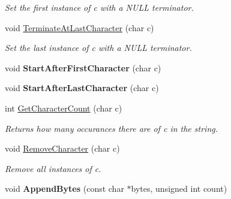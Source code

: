 \begin{DoxyCompactItemize}
\begin{DoxyCompactList}\small\item\em Set the first instance of c with a N\-U\-L\-L terminator. \end{DoxyCompactList}\item 
\hypertarget{class_rak_net_1_1_rak_string_a47359a2ee66669ab9a1873d49a06eab4}{void \hyperlink{class_rak_net_1_1_rak_string_a47359a2ee66669ab9a1873d49a06eab4}{Terminate\-At\-Last\-Character} (char c)}\label{class_rak_net_1_1_rak_string_a47359a2ee66669ab9a1873d49a06eab4}

\begin{DoxyCompactList}\small\item\em Set the last instance of c with a N\-U\-L\-L terminator. \end{DoxyCompactList}\item 
\hypertarget{class_rak_net_1_1_rak_string_a315814d5d006f19b3de45ed7638e93d0}{void {\bfseries Start\-After\-First\-Character} (char c)}\label{class_rak_net_1_1_rak_string_a315814d5d006f19b3de45ed7638e93d0}

\item 
\hypertarget{class_rak_net_1_1_rak_string_a04a5582c16e736fd06a119ccf84e518f}{void {\bfseries Start\-After\-Last\-Character} (char c)}\label{class_rak_net_1_1_rak_string_a04a5582c16e736fd06a119ccf84e518f}

\item 
\hypertarget{class_rak_net_1_1_rak_string_aade62bca9d8ca96dc475e98b49b4d0ce}{int \hyperlink{class_rak_net_1_1_rak_string_aade62bca9d8ca96dc475e98b49b4d0ce}{Get\-Character\-Count} (char c)}\label{class_rak_net_1_1_rak_string_aade62bca9d8ca96dc475e98b49b4d0ce}

\begin{DoxyCompactList}\small\item\em Returns how many occurances there are of {\itshape c} in the string. \end{DoxyCompactList}\item 
\hypertarget{class_rak_net_1_1_rak_string_a30ed346a44897c35a8828b9f03e9a03a}{void \hyperlink{class_rak_net_1_1_rak_string_a30ed346a44897c35a8828b9f03e9a03a}{Remove\-Character} (char c)}\label{class_rak_net_1_1_rak_string_a30ed346a44897c35a8828b9f03e9a03a}

\begin{DoxyCompactList}\small\item\em Remove all instances of c. \end{DoxyCompactList}\item 
\hypertarget{class_rak_net_1_1_rak_string_a23f991c5a1eaffbd11e3657897c7d000}{void {\bfseries Append\-Bytes} (const char $\ast$bytes, unsigned int count)}\label{class_rak_net_1_1_rak_string_a23f991c5a1eaffbd11e3657897c7d000}


\end{DoxyCompactItemize}
